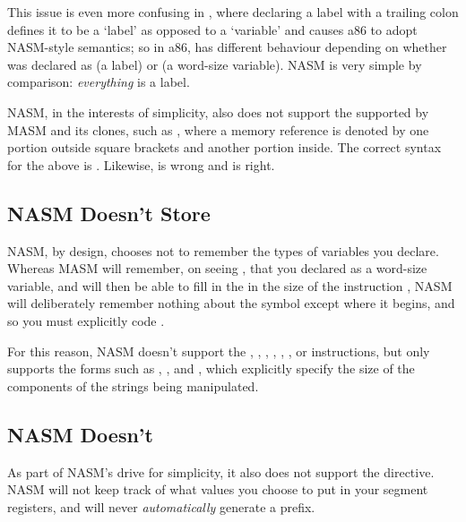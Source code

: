 This issue is even more confusing in , where declaring a
label with a trailing colon defines it to be a `label' as opposed to
a `variable' and causes a86 to adopt NASM-style semantics; so in
a86,  has different behaviour depending on whether
 was declared as  (a label) or
 (a word-size variable). NASM is very simple by
comparison: \emph{everything} is a label.

NASM, in the interests of simplicity, also does not support the
 supported by MASM and its clones, such as
, where a memory reference is denoted by one
portion outside square brackets and another portion inside. The
correct syntax for the above is . Likewise,
 is wrong and  is right.

\subsection{NASM Doesn't Store }
\label{subsec:qstypes}

NASM, by design, chooses not to remember the types of variables you
declare. Whereas MASM will remember, on seeing , that
you declared  as a word-size variable, and will then be able
to fill in the  in the size of the instruction
, NASM will deliberately remember nothing about
the symbol  except where it begins, and so you must
explicitly code .

For this reason, NASM doesn't support the , ,
, , , , or 
instructions, but only supports the forms such as ,
, and , which explicitly specify the size
of the components of the strings being manipulated.

\subsection{NASM Doesn't }
\label{subsec:qsassume}

As part of NASM's drive for simplicity, it also does not support the
 directive. NASM will not keep track of what values you
choose to put in your segment registers, and will never \emph{automatically}
generate a  prefix.

